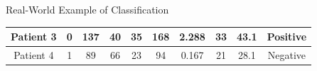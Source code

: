 \documentclass[serif, aspectratio=169]{beamer}
\begin{document}
\begin{frame}{Real-World Example of Classification}
\begin{table}[]
{\begin{tabular}{|c|c|c|c|c|c|c|c|c|c|}
\cellcolor[HTML]{C0C0C0}Patient 3                                         & 0                                                 & 137                                               & 40                                                & 35                                                & 168                                               & 2.288                                             & 33                                                & 43.1                                              & \cellcolor[HTML]{FE0000}Positive                  \\ \hline
\cellcolor[HTML]{C0C0C0}Patient 4                                         & 1                                                 & 89                                                & 66                                                & 23                                                & 94                                                & 0.167                                             & 21                                                & 28.1                                              & \cellcolor[HTML]{32CB00}Negative                  \\ \hline

\end{tabular}}
\end{table}
\end{frame}
\end{document}
